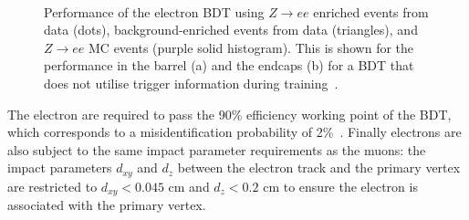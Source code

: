 \begin{figure}[t]
\centering
     \\
\caption{Performance of the electron BDT using $Z\rightarrow ee$ enriched events from data (dots), background-enriched events from data (triangles), and $Z\rightarrow ee$ MC events (purple solid histogram). This is shown for the performance in the barrel (a) and the endcaps (b) for a BDT that does not utilise trigger information during training~\cite{CMS:2015xaf}.}
\label{fig:electron_eff}
\end{figure}

The electron are required to pass the 90\% efficiency working point of the \ac{BDT}, which corresponds to a misidentification probability of 2\%~\cite{CMS:2015xaf}. 
Finally electrons are also subject to the same impact parameter requirements as the muons: the impact parameters $d_{xy}$ and $d_{z}$ between the electron track and the primary vertex are restricted to $d_{xy}<0.045$ cm and $d_{z}<0.2$ cm to ensure the electron is associated with the primary vertex. \\

